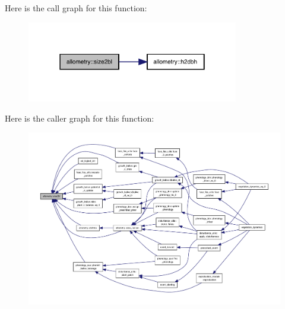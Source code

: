 Here is the call graph for this function\+:
\nopagebreak
\begin{figure}[H]
\begin{center}
\leavevmode
\includegraphics[width=262pt]{namespaceallometry_a45ced9bf9ccd03debe8def35b579f4bd_cgraph}
\end{center}
\end{figure}
Here is the caller graph for this function\+:
\nopagebreak
\begin{figure}[H]
\begin{center}
\leavevmode
\includegraphics[width=350pt]{namespaceallometry_a45ced9bf9ccd03debe8def35b579f4bd_icgraph}
\end{center}
\end{figure}
